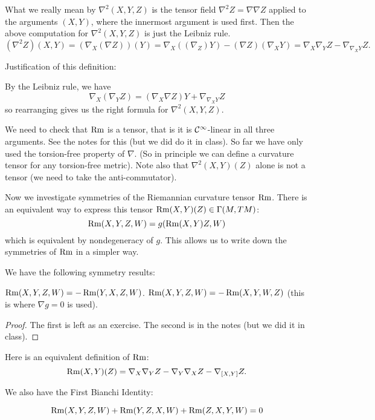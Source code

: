 \begin{rmk}
  What we really mean by $\nabla^2(X,Y,Z)$ is the tensor field $\nabla^2Z=\nabla\nabla Z$ applied to the arguments $(X,Y)$, where the innermost argument is used first.
  Then the above computation for $\nabla^2(X,Y,Z)$ is just the Leibniz rule.\:
  \[ (\nabla^2 Z)(X,Y) = (\nabla_X(\nabla Z))(Y) = \nabla_X( (\nabla_Z)Y) - (\nabla Z)(\nabla_XY) = \nabla_X\nabla_YZ - \nabla_{\nabla_XY}Z. \]
\end{rmk}

Justification of this definition:
\begin{enum}
  \io
  By the Leibniz rule, we have
  \[ \nabla_X(\nabla_YZ) = (\nabla_X\nabla Z)Y + \nabla_{\nabla_XY}Z \]
  so rearranging gives us the right formula for $\nabla^2(X,Y,Z)$.

  \io
  We need to check that $\operatorname{Rm}$ is a tensor, that is it is $\mathcal{C}^\infty$-linear in all three arguments.
  See the notes for this (but we did do it in class).
  So far we have only used the torsion-free property of $\nabla$.
  (So in principle we can define a curvature tensor for any torsion-free metric).
  Note also that $\nabla^2(X,Y)(Z)$ alone is not a tensor (we need to take the anti-commutator).
\end{enum}

Now we investigate symmetries of the Riemannian curvature tensor $\operatorname{Rm}$.
There is an equivalent way to express this tensor $\operatorname{Rm}(X,Y)(Z)\in\Gamma(M,TM)$:
\[ \operatorname{Rm}(X,Y,Z,W) = g(\operatorname{Rm}(X,Y)Z,W) \]
which is equivalent by nondegeneracy of $g$.
This allows us to write down the symmetries of $\operatorname{Rm}$ in a simpler way.

We have the following symmetry results:
\begin{prop}
  \lv
  \begin{enum}
    \io $\operatorname{Rm}(X,Y,Z,W) = -\operatorname{Rm}(Y,X,Z,W)$.
    \io $\operatorname{Rm}(X,Y,Z,W) = -\operatorname{Rm}(X,Y,W,Z)$ (this is where $\nabla g=0$ is used).
  \end{enum}
\end{prop}

\begin{proof}
  The first is left as an exercise.
  The second is in the notes (but we did it in class).
\end{proof}

\begin{rmk}
  Here is an equivalent definition of $\operatorname{Rm}$:
  \[ \operatorname{Rm}(X,Y)(Z) = \nabla_X \nabla_Y Z - \nabla_Y \nabla_X Z - \nabla_{[X,Y]}Z. \]
\end{rmk}

We also have the First Bianchi Identity:
\begin{prop}
  \[ \operatorname{Rm}(X,Y,Z,W) + \operatorname{Rm}(Y,Z,X,W) + \operatorname{Rm}(Z,X,Y,W) = 0 \]
\end{prop}

